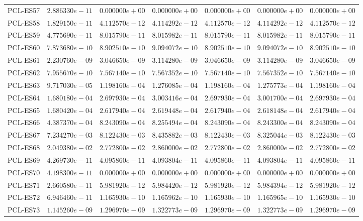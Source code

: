 \begin{longtable}{lrrrrrr}
PCL-ES57 & $2.886330e-11$ & $0.000000e+00$ & $0.000000e+00$ & $0.000000e+00$ & $0.000000e+00$ & $0.000000e+00$ \\
PCL-ES58 & $1.829150e-11$ & $4.112570e-12$ & $4.114292e-12$ & $4.112570e-12$ & $4.114292e-12$ & $4.112570e-12$ \\
PCL-ES59 & $4.775690e-11$ & $8.015790e-11$ & $8.015982e-11$ & $8.015790e-11$ & $8.015982e-11$ & $8.015790e-11$ \\
PCL-ES60 & $7.873680e-10$ & $8.902510e-10$ & $9.094072e-10$ & $8.902510e-10$ & $9.094072e-10$ & $8.902510e-10$ \\
PCL-ES61 & $2.230760e-09$ & $3.046650e-09$ & $3.114280e-09$ & $3.046650e-09$ & $3.114280e-09$ & $3.046650e-09$ \\
PCL-ES62 & $7.955670e-10$ & $7.567140e-10$ & $7.567352e-10$ & $7.567140e-10$ & $7.567352e-10$ & $7.567140e-10$ \\
PCL-ES63 & $9.717030e-05$ & $1.198160e-04$ & $1.276085e-04$ & $1.198160e-04$ & $1.275773e-04$ & $1.198160e-04$ \\
PCL-ES64 & $1.680180e-04$ & $2.697930e-04$ & $3.003416e-04$ & $2.697930e-04$ & $3.001700e-04$ & $2.697930e-04$ \\
PCL-ES65 & $1.680420e-04$ & $2.617940e-04$ & $2.619448e-04$ & $2.617940e-04$ & $2.618148e-04$ & $2.617940e-04$ \\
PCL-ES66 & $4.387370e-04$ & $8.243090e-04$ & $8.255494e-04$ & $8.243090e-04$ & $8.243300e-04$ & $8.243090e-04$ \\
PCL-ES67 & $7.234270e-03$ & $8.122430e-03$ & $8.435882e-03$ & $8.122430e-03$ & $8.325044e-03$ & $8.122430e-03$ \\
PCL-ES68 & $2.049380e-02$ & $2.772800e-02$ & $2.860000e-02$ & $2.772800e-02$ & $2.860000e-02$ & $2.772800e-02$ \\
PCL-ES69 & $4.269730e-11$ & $4.095860e-11$ & $4.093804e-11$ & $4.095860e-11$ & $4.093804e-11$ & $4.095860e-11$ \\
PCL-ES70 & $4.198300e-11$ & $0.000000e+00$ & $0.000000e+00$ & $0.000000e+00$ & $0.000000e+00$ & $0.000000e+00$ \\
PCL-ES71 & $2.660580e-11$ & $5.981920e-12$ & $5.984420e-12$ & $5.981920e-12$ & $5.984394e-12$ & $5.981920e-12$ \\
PCL-ES72 & $6.946460e-11$ & $1.165930e-10$ & $1.165962e-10$ & $1.165930e-10$ & $1.165965e-10$ & $1.165930e-10$ \\
PCL-ES73 & $1.145260e-09$ & $1.296970e-09$ & $1.322773e-09$ & $1.296970e-09$ & $1.322773e-09$ & $1.296970e-09$ \\

\end{longtable}
